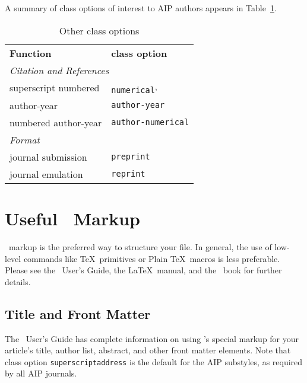 \documentclass[%
 reprint,%
 amssymb, amsmath,%
 aip,cha,%
]{revtex4-1}
\begin{document}
A summary of class options of interest to AIP authors appears in Table~\ref{tab:options}.
\begin{table}
\caption{\label{tab:options}Other class options}
\begin{ruledtabular}
\begin{tabular}{ll}
\textbf{Function} & \textbf{class option} \\
\multicolumn{2}{l}{\textit{Citation and References}}\\
superscript numbered&\texttt{numerical}\footnotemark[1]\textsuperscript{,}\footnotemark[2]\\
author-year&\texttt{author-year}\footnotemark[3]\\
numbered author-year&\texttt{author-numerical}\footnotemark[3]\\
%
\multicolumn{2}{l}{\textit{Format}}\\
journal submission&\texttt{preprint}\footnotemark[1]\\
journal emulation&\texttt{reprint}\\
\end{tabular}
\end{ruledtabular}
%
%
%
\end{table}

\section{Useful \LaTeXe\ Markup}
\LaTeXe\ markup is the preferred way to structure your file. 
In general, the use of low-level commands like \TeX\ primitives or Plain \TeX\ macros 
is less preferable. 
Please see the \revtex\ User's Guide,\cite{Note2} 
the \LaTeX\ manual,\cite{LaTeXman} 
and the \LaTeXe\ book\cite{Compan} 
for further details. 

\subsection{Title and Front Matter}\label{sec:front}

The \revtex\ User's Guide has complete information on using \revtex's special markup for your
article's title, author list, abstract, and other front matter elements. 
Note that class option \texttt{superscriptaddress} is the default for the AIP substyles, 
as required by all AIP journals. 
\end{document}
